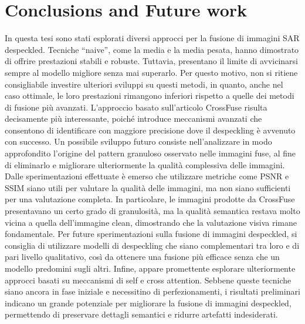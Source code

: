
\chapter{Conclusions and Future work}
In questa tesi sono stati esplorati diversi approcci per la fusione di immagini SAR despeckled. 
Tecniche “naive”, come la media e la media pesata, hanno dimostrato di offrire prestazioni stabili e 
robuste. Tuttavia, presentano il limite di avvicinarsi sempre al modello migliore senza mai superarlo. 
Per questo motivo, non si ritiene consigliabile investire ulteriori sviluppi su questi metodi, 
in quanto, anche nel caso ottimale, le loro prestazioni rimangono inferiori rispetto a quelle dei 
metodi di fusione più avanzati.
L’approccio basato sull’articolo CrossFuse risulta decisamente più interessante, poiché introduce 
meccanismi avanzati che consentono di identificare con maggiore precisione dove il despeckling è 
avvenuto con successo. Un possibile sviluppo futuro consiste nell’analizzare in modo approfondito 
l’origine del pattern granuloso osservato nelle immagini fuse, al fine di eliminarlo e 
migliorare ulteriormente la qualità complessiva delle immagini.
Dalle sperimentazioni effettuate è emerso che utilizzare metriche come PSNR e SSIM siano 
utili per valutare la qualità delle immagini, ma non siano sufficienti per una valutazione 
completa. In particolare, le immagini prodotte da CrossFuse presentavano un certo grado di 
granulosità, ma la qualità semantica restava molto vicina a quella dell’immagine clean, 
dimostrando che la valutazione visiva rimane fondamentale.
Per future sperimentazioni sulla fusione di immagini despeckled, si consiglia di utilizzare 
modelli di despeckling che siano complementari tra loro e di pari livello qualitativo, 
così da ottenere una fusione più efficace senza che un modello predomini sugli altri.
Infine, appare promettente esplorare ulteriormente approcci basati su meccanismi di self e 
cross attention. Sebbene queste tecniche siano ancora in fase iniziale e necessitino di 
perfezionamenti, i risultati preliminari indicano un grande potenziale per migliorare la 
fusione di immagini despeckled, permettendo di preservare dettagli semantici e ridurre artefatti indesiderati.